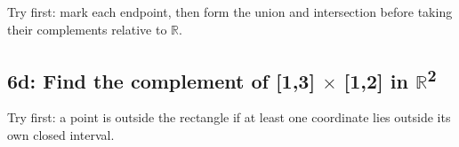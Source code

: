 \documentclass[11pt]{article}
\begin{document}
\begin{keepsection}
\begin{keepsection}
Try first: mark each endpoint, then form the union and intersection before taking their complements relative to \ensuremath{\mathbb{R}}.

\end{keepsection}

\begin{keepsection}
\subsection{6d: Find the complement of [1,3] \ensuremath{\times} [1,2] in \ensuremath{\mathbb{R}}\textsuperscript{2}}

Try first: a point is outside the rectangle if at least one coordinate lies outside its own closed interval.

\end{keepsection}
\end{keepsection}
\end{document}
